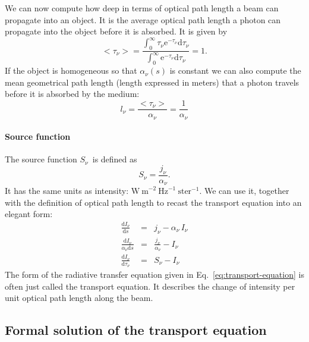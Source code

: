 \documentclass[12pt]{article}
\numberwithin{equation}{section}
\def\exp{\mathrm{e}}
\def\dd{\mathrm{d}}
\def\Inu{\ensuremath{I_{\nu}}}
\def\jnu{\ensuremath{j_{\nu}}}
\def\Snu{\ensuremath{S_{\nu}}}
\def\anu{\ensuremath{\alpha_{\nu}}}
\def\taunu{\ensuremath{\tau_{\nu}}}
\def\ds{\ensuremath{\dd s}}
\newcommand{\be}{\begin{equation}}
\newcommand{\ee}{\end{equation}}
\newcommand{\bea}{\begin{eqnarray}}
\newcommand{\eea}{\end{eqnarray}}
\begin{document}
We can now compute how deep in terms of optical path length a beam can propagate into an object. It is the average optical path length a photon can propagate into the object before it is absorbed. It is given by
\be
<\taunu> = \frac{\int_0^\infty \taunu \exp^{-\taunu} \dd \taunu}{\int_0^\infty \exp^{-\taunu} \dd \taunu} = 1.
\ee
If the object is homogeneous so that $\anu(s)$ is constant we can also compute the mean geometrical path length (length expressed in meters) that a photon travels before it is absorbed by the medium:
\be
l_\nu = \frac{<\taunu>}{\anu} = \frac{1}{\anu}
\ee

\paragraph{Source function}
The source function \Snu\ is defined as 
\be
\Snu = \frac{\jnu}{\anu}. 
\ee
It has the same units as intensity: $\mathrm{W\ m}^{-2} \ \mathrm{Hz}^{-1} \ \mathrm{ster}^{-1}$. We can use it, together with the definition of optical path length to recast the transport equation into an elegant form:
\bea
\frac{\dd \Inu}{\ds} &=& \jnu  - \anu \, \Inu \nonumber \\
\frac{\dd \Inu}{\anu \ds} &=& \frac{\jnu}{\anu}  -\Inu \nonumber \\
\frac{\dd \Inu}{\dd \taunu} &=& \Snu -\Inu \label{eq:transport-equation}
\eea
The form of the radiative transfer equation given in Eq.~\ref{eq:transport-equation} is often just called the transport equation. It describes the change of intensity per unit optical path length along the beam.

\subsection{Formal solution of the transport equation}
\end{document}
